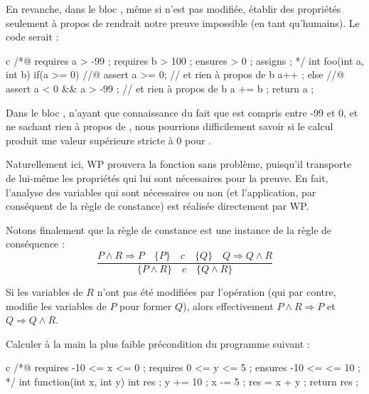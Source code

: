 En revanche, dans le bloc , même si  n'est pas modifiée, établir
des propriétés seulement à propos de  rendrait notre preuve impossible (en
tant qu'humains). Le code serait :



\begin{CodeBlock}{c}
/*@
  requires a > -99 ;
  requires b > 100 ;
  ensures  \result > 0 ;
  assigns  \nothing ;
*/
int foo(int a, int b){
  if(a >= 0){
    //@ assert a >= 0; // et rien à propos de b
    a++ ;
  } else {
    //@ assert a < 0 && a > -99 ; // et rien à propos de b
    a += b ;
  }
  return a ;
}
\end{CodeBlock}



Dans le bloc , n'ayant que connaissance du fait que  est compris
entre -99 et 0, et ne sachant rien à propos de , nous pourrions
difficilement savoir si le calcul  produit une valeur supérieure
stricte à 0 pour .



Naturellement ici, WP prouvera la fonction sans problème, puisqu'il transporte
de lui-même les propriétés qui lui sont nécessaires pour la preuve. En fait,
l'analyse des variables qui sont nécessaires ou non (et l'application, par
conséquent de la règle de constance) est réalisée directement par WP.



Notons finalement que la règle de constance est une instance de la règle de
conséquence :
$$\dfrac{P \wedge R \Rightarrow P \quad \{P\}\quad c\quad \{Q\} \quad Q \Rightarrow Q \wedge R}{\{P \wedge R\}\quad c\quad \{Q \wedge R\}}$$



Si les variables de $R$ n'ont pas été modifiées par l'opération (qui par contre,
modifie les variables de $P$ pour former $Q$), alors effectivement
$P \wedge R \Rightarrow P$ et $Q \Rightarrow Q \wedge R$.







Calculer à la main la plus faible précondition du programme suivant :


\begin{CodeBlock}{c}
/*@
  requires -10 <= x <= 0 ;
  requires 0 <= y <= 5 ;
  ensures -10 <= \result <= 10 ;
*/
int function(int x, int y){
  int res ;
  y += 10 ;
  x -= 5 ;
  res = x + y ;
  return res ;
}
\end{CodeBlock}


